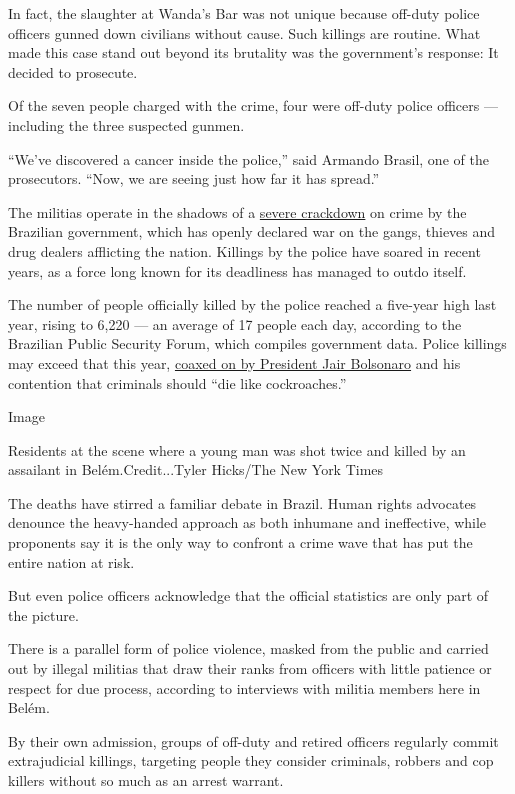 In fact, the slaughter at Wanda's Bar was not unique because off-duty
police officers gunned down civilians without cause. Such killings are
routine. What made this case stand out beyond its brutality was the
government's response: It decided to prosecute.

Of the seven people charged with the crime, four were off-duty police
officers --- including the three suspected gunmen.

``We've discovered a cancer inside the police,'' said Armando Brasil,
one of the prosecutors. ``Now, we are seeing just how far it has
spread.''

The militias operate in the shadows of a
\href{https://www.nytimes3xbfgragh.onion/2019/05/26/world/americas/brazil-rio-police-kill.html}{severe
crackdown} on crime by the Brazilian government, which has openly
declared war on the gangs, thieves and drug dealers afflicting the
nation. Killings by the police have soared in recent years, as a force
long known for its deadliness has managed to outdo itself.

The number of people officially killed by the police reached a five-year
high last year, rising to 6,220 --- an average of 17 people each day,
according to the Brazilian Public Security Forum, which compiles
government data. Police killings may exceed that this year,
\href{https://www.nytimes3xbfgragh.onion/2018/11/01/world/americas/bolsonaro-police-kill-criminals.html}{coaxed
on by President Jair Bolsonaro} and his contention that criminals should
``die like cockroaches.''

Image

Residents at the scene where a young man was shot twice and killed by an
assailant in Belém.Credit...Tyler Hicks/The New York Times

The deaths have stirred a familiar debate in Brazil. Human rights
advocates denounce the heavy-handed approach as both inhumane and
ineffective, while proponents say it is the only way to confront a crime
wave that has put the entire nation at risk.

But even police officers acknowledge that the official statistics are
only part of the picture.

There is a parallel form of police violence, masked from the public and
carried out by illegal militias that draw their ranks from officers with
little patience or respect for due process, according to interviews with
militia members here in Belém.

By their own admission, groups of off-duty and retired officers
regularly commit extrajudicial killings, targeting people they consider
criminals, robbers and cop killers without so much as an arrest warrant.

